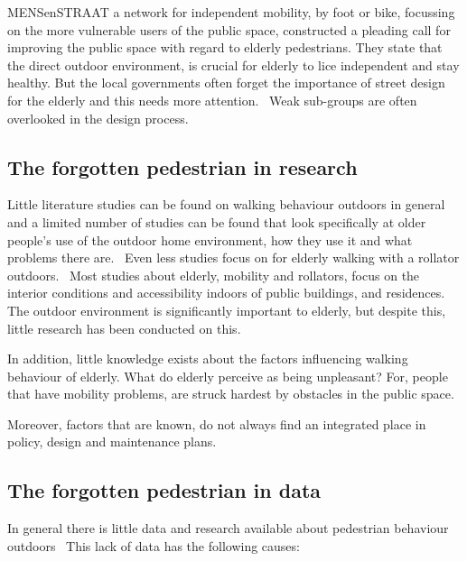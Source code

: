 MENSenSTRAAT a network for independent mobility, by foot or bike, focussing on the more vulnerable users of the public space, constructed a pleading call for improving the public space with regard to elderly pedestrians. They state that the direct outdoor environment, is crucial for elderly to lice independent and stay healthy. But the local governments often forget the importance of street design for the elderly and this needs more attention.~\cite{MENSenSTRAAT2014} Weak sub-groups are often overlooked in the design process.~\cite{MENSenSTRAAT2014}

\subsection{The forgotten pedestrian in research}
Little literature studies can be found on walking behaviour outdoors in general~\cite{Vine2012} and a limited number of studies can be found that look specifically at older people's use of the outdoor home environment, how they use it and what problems there are.~\cite{Phillips2013, Stahl2008} Even less studies focus on for elderly walking with a rollator outdoors.~\cite{Stahl2008, Stahl2013, Phillips2013} 
Most studies about elderly, mobility and rollators, focus on the interior conditions and accessibility indoors of public buildings, and residences.~\cite{Crow2014, Sauter2010, Verschuur2013} The outdoor environment is significantly important to elderly, but despite this, little research has been conducted on this.~\cite{Stahl2008} 

In addition, little knowledge exists about the factors influencing walking behaviour of elderly. What do elderly perceive as being unpleasant? For, people that have mobility problems, are struck hardest by obstacles in the public space.~\cite{VandeRidder2008}

Moreover, factors that are known, do not always find an integrated place in policy, design and maintenance plans.

\subsection{The forgotten pedestrian in data}
In general there is little data and research available about pedestrian behaviour outdoors~\cite{Sauter2010} This lack of data has the following causes:

